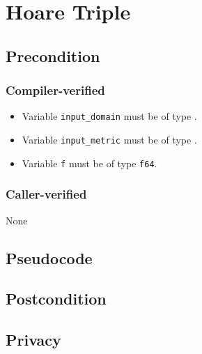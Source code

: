 \documentclass{article}
\begin{document}
\section{Hoare Triple}
\subsection*{Precondition}
\subsubsection*{Compiler-verified}
\begin{itemize}
	\item Variable \texttt{input\_domain} must be of type .
	\item Variable \texttt{input\_metric} must be of type .
	\item Variable \texttt{f} must be of type \texttt{f64}.
\end{itemize}

\subsubsection*{Caller-verified}
None

\subsection*{Pseudocode}



\subsection*{Postcondition}
\begin{theorem}
\end{theorem}
\subsection{Privacy}
\end{document}

